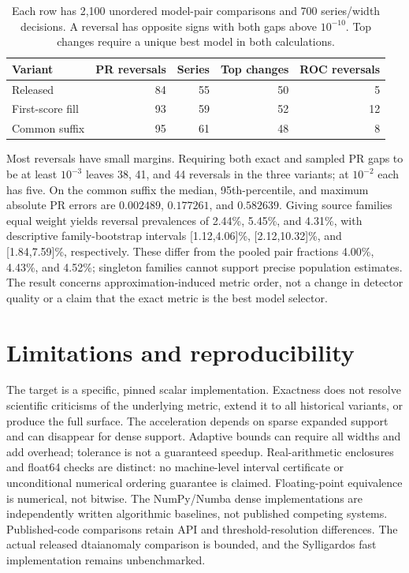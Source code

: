 \begin{table}[t]
\centering
\begin{tabular}{lrrrr}
\toprule
Variant & PR reversals & Series & Top changes & ROC reversals\\
\midrule
Released & 84 & 55 & 50 & 5\\
First-score fill & 93 & 59 & 52 & 12\\
Common suffix & 95 & 61 & 48 & 8\\
\bottomrule
\end{tabular}
\caption{Each row has 2,100 unordered model-pair comparisons and 700
series/width decisions. A reversal has opposite signs with both gaps
above $10^{-10}$. Top changes require a unique best model in both calculations.}
\label{tab:padding}
\end{table}

Most reversals have small margins. Requiring both exact and sampled PR gaps
to be at least $10^{-3}$ leaves 38, 41, and 44 reversals in the three variants;
at $10^{-2}$ each has five. On the common suffix the median, 95th-percentile,
and maximum absolute PR errors are $0.002489$, $0.177261$, and $0.582639$.
Giving source families equal weight yields reversal prevalences of
2.44\%, 5.45\%, and 4.31\%, with descriptive family-bootstrap intervals
[1.12,4.06]\%, [2.12,10.32]\%, and [1.84,7.59]\%, respectively.
These differ from the pooled pair fractions 4.00\%, 4.43\%, and 4.52\%;
singleton families cannot support precise population estimates.
The result concerns approximation-induced metric order, not a change in
detector quality or a claim that the exact metric is the best model selector.

\section{Limitations and reproducibility}
The target is a specific, pinned scalar implementation. Exactness does not
resolve scientific criticisms of the underlying metric, extend it to all
historical variants, or produce the full surface. The acceleration depends on
sparse expanded support and can disappear for dense support. Adaptive bounds
can require all widths and add overhead; tolerance is not a guaranteed speedup.
Real-arithmetic enclosures and float64 checks are distinct: no machine-level
interval certificate or unconditional numerical ordering guarantee is claimed.
Floating-point equivalence is numerical, not bitwise. The NumPy/Numba dense implementations
are independently written algorithmic baselines, not published competing
systems. Published-code comparisons retain API and threshold-resolution
differences. The actual released dtaianomaly comparison is bounded, and the
Sylligardos fast implementation remains unbenchmarked.

